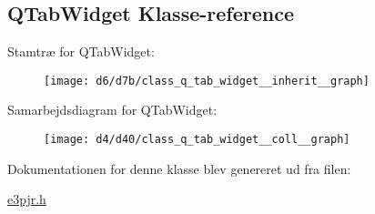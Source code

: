 \hypertarget{class_q_tab_widget}{}\subsection{Q\+Tab\+Widget Klasse-\/reference}
\label{class_q_tab_widget}


Stamtræ for Q\+Tab\+Widget\+:\nopagebreak
\begin{figure}[H]
\begin{center}
\leavevmode
\texttt{[image: d6/d7b/class\_q\_tab\_widget\_\_inherit\_\_graph]}
\end{center}
\end{figure}


Samarbejdsdiagram for Q\+Tab\+Widget\+:\nopagebreak
\begin{figure}[H]
\begin{center}
\leavevmode
\texttt{[image: d4/d40/class\_q\_tab\_widget\_\_coll\_\_graph]}
\end{center}
\end{figure}


Dokumentationen for denne klasse blev genereret ud fra filen\+:\begin{DoxyCompactItemize}
\item 
\hyperlink{e3pjr_8h}{e3pjr.\+h}\end{DoxyCompactItemize}
